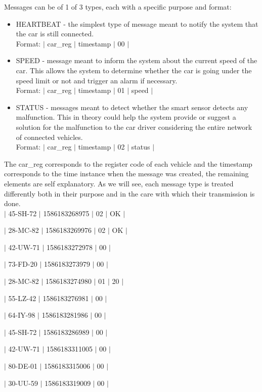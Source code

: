 \documentclass[12pt]{article}
\begin{document}
Messages can be of 1 of 3 types, each with a specific purpose and format:

\vspace{-10pt}
\begin{itemize}[noitemsep]
  \item HEARTBEAT - the simplest type of message meant to notify the system that the car is still connected. \\ Format: $|$ car\_reg $|$ timestamp $|$ 00 $|$
  \item SPEED - message meant to inform the system about the current speed of the car. This allows the system to determine whether the car is going under the speed limit or not and trigger an alarm if necessary. \\ Format: $|$ car\_reg $|$ timestamp $|$ 01 $|$ speed $|$
  \item STATUS - messages meant to detect whether the smart sensor detects any malfunction. This in theory could help the system provide or suggest a solution for the malfunction to the car driver considering the entire network of connected vehicles. \\ Format: $|$ car\_reg $|$ timestamp $|$ 02 $|$ status $|$
\end{itemize}
\vspace{-10pt}
The car\_reg corresponds to the register code of each vehicle and the timestamp corresponds to the time instance when the message was created, the remaining 
elements are self explanatory.
As we will see, each message type is treated differently both in their purpose and in the care with which their transmission is done. \\
  
$|$ 45-SH-72 $|$ 1586183268975 $|$ 02 $|$ OK $|$

$|$ 28-MC-82 $|$ 1586183269976 $|$ 02 $|$ OK $|$

$|$ 42-UW-71 $|$ 1586183272978 $|$ 00 $|$

$|$ 73-FD-20 $|$ 1586183273979 $|$ 00 $|$

$|$ 28-MC-82 $|$ 1586183274980 $|$ 01 $|$ 20 $|$

$|$ 55-LZ-42 $|$ 1586183276981 $|$ 00 $|$

$|$ 64-IY-98 $|$ 1586183281986 $|$ 00 $|$

$|$ 45-SH-72 $|$ 1586183286989 $|$ 00 $|$

$|$ 42-UW-71 $|$ 1586183311005 $|$ 00 $|$

$|$ 80-DE-01 $|$ 1586183315006 $|$ 00 $|$

$|$ 30-UU-59 $|$ 1586183319009 $|$ 00 $|$
\end{document}
